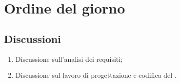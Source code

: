 \section{Ordine del giorno} \label{sec:agenda}
\subsection{Discussioni} \label{subsec:discussione}
\begin{enumerate}
    \item Discussione sull'analisi dei requisiti;
    \item Discussione sul lavoro di progettazione e  codifica del .
\end{enumerate}
